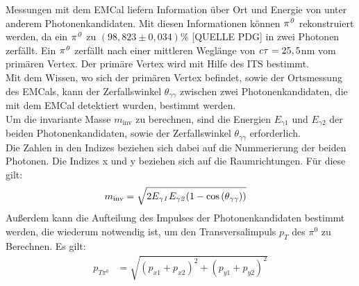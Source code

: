 \documentclass[11pt]{article}
\begin{document}
Messungen mit dem EMCal liefern Information {\"u}ber Ort und Energie von unter anderem Photonenkandidaten. Mit diesen Informationen k{\"o}nnen ${\it \pi^{0}}$ rekonstruiert werden, da ein ${\it \pi^{0}}$ zu $\left( 98,823\pm0,034\right)\%$ [QUELLE PDG] in zwei Photonen zerf{\"a}llt. Ein ${\it \pi^{0}}$ zerf{\"a}llt nach einer mittleren Wegl{\"a}nge von ${\it c\tau} = 25,5$nm vom prim{\"a}ren Vertex. Der prim{\"a}re Vertex wird mit Hilfe des ITS bestimmt. \\
Mit dem Wissen, wo sich der prim{\"a}ren Vertex befindet, sowie der Ortsmessung des EMCals, kann der Zerfallswinkel $\theta_{\gamma\gamma}$ zwischen zwei Photonenkandidaten, die mit dem EMCal detektiert wurden, bestimmt werden. \\ 
Um die invariante Masse $m_{\text{inv}}$ zu berechnen, sind die Energien $E_{\gamma1}$ und $E_{\gamma2}$ der beiden Photonenkandidaten, sowie der Zerfallswinkel $\theta_{\gamma\gamma}$ erforderlich. \\
Die Zahlen in den Indizes beziehen sich dabei auf die Nummerierung der beiden Photonen. Die Indizes x und y beziehen sich auf die Raumrichtungen. F{\"u}r diese gilt:
\begin{align}
m_{\text{inv}} &= \sqrt{2E_{\gamma\it{1}}E_{\gamma\it{2}}(1-\cos\left( \theta_{\gamma\gamma}\right) )} \label{eq_invmass}
\end{align}
Au{\ss}erdem kann die Aufteilung des Impulses der Photonenkandidaten bestimmt werden, die wiederum notwendig ist, um den Transversalimpuls $p_{T}$ des $\pi^{0}$ zu Berechnen. Es gilt:
\begin{align}
p_{T\pi^{0}} &= \sqrt{\left(p_{x1}+p_{x2}\right)^{2} +\left(p_{y1}+p_{y2}\right)^{2}} \label{eq_pt}
\end{align}
\end{document}
